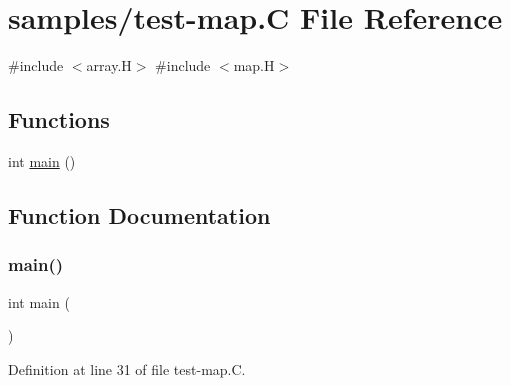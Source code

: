 \hypertarget{test-map_8_c}{}\section{samples/test-\/map.C File Reference}
\label{test-map_8_c}
{\ttfamily \#include $<$array.\+H$>$}\newline
{\ttfamily \#include $<$map.\+H$>$}\newline
\subsection*{Functions}
\begin{DoxyCompactItemize}
\item 
int \hyperlink{test-map_8_c_ae66f6b31b5ad750f1fe042a706a4e3d4}{main} ()
\end{DoxyCompactItemize}


\subsection{Function Documentation}
\mbox{\label{test-map_8_c_ae66f6b31b5ad750f1fe042a706a4e3d4}} 
\subsubsection{\texorpdfstring{main()}{main()}}
{\footnotesize\ttfamily int main (\begin{DoxyParamCaption}{ }\end{DoxyParamCaption})}



Definition at line 31 of file test-\/map.\+C.

